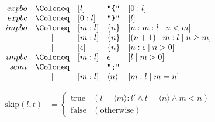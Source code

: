 \begin{align*}
  \begin{array}{rclll}
    {expbo}
    & \Coloneq & [l] &\text{\texttt{\textquotedbl\{\textquotedbl}} &[0:l] \\
    {expbc}
    & \Coloneq & [0:l] &\text{\texttt{\textquotedbl\}\textquotedbl}} &[l] \\
    {impbo}
    & \Coloneq & [m:l] &\{ n\} &[n:m:l \mid n < m] \\
    & \mid & [m:l] &\{ n\} &[(n + 1):m:l \mid n \geq m] \\
    & \mid & [\epsilon] &\{ n\} &[n:\epsilon \mid n > 0] \\
    {impbc}
    & \Coloneq & [m:l] &\epsilon &[l \mid m > 0] \\
    {semi}
    & \Coloneq & &\text{\texttt{\textquotedbl ;\textquotedbl}} \\
    & \mid & [m:l] & \langle n\rangle &[m:l \mid m = n]
  \end{array}
\end{align*}

\begin{align*}
  \mathrm{skip}(l, t) &= \left\{\begin{array}{ll}
    \mathrm{true} &(l = \langle m\rangle:l' \land t = \langle n\rangle \land m < n) \\
    \mathrm{false} &(\text{otherwise})
  \end{array}\right.
\end{align*}
